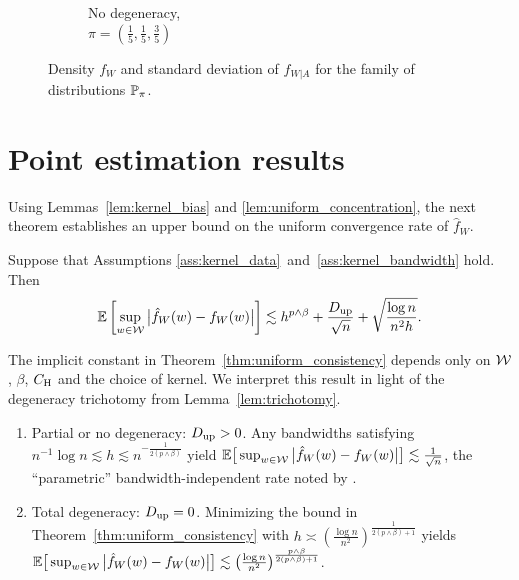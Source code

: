 \begin{figure}[ht]
\begin{subfigure}{0.32\textwidth}
    \caption{
      No degeneracy, \\
      $\pi = \left( \frac{1}{5}, \frac{1}{5}, \frac{3}{5} \right)$
    }
  \end{subfigure}
  \caption{
    Density $f_W$ and standard deviation
    of $f_{W|A}$ for the family of distributions $\P_\pi$.\\
  }
  \label{fig:distribution}
\end{figure}

\section{Point estimation results}\label{sec:point_estimation}

Using Lemmas~\ref{lem:kernel_bias} and \ref{lem:uniform_concentration},
the next theorem establishes an upper bound on the
uniform convergence rate of $\hat f_W$.
%
\begin{theorem}%
  \label{thm:uniform_consistency}%
  Suppose that Assumptions
  \ref{ass:kernel_data}~and~\ref{ass:kernel_bandwidth}
  hold. Then
  \begin{align*}
    \E\left[
      \sup_{w \in \cW}
      \big|\hat{f}_W(w) - f_W(w)\big|
    \right]
    \lesssim
    h^{p\wedge\beta}
    + \frac{\Du}{\sqrt n}
    + \sqrt{\frac{\log n}{n^2h}}.
  \end{align*}
\end{theorem}
%
The implicit constant in Theorem~\ref{thm:uniform_consistency}
depends only on $\cW$, $\beta$, $C_\rH$
and the choice of kernel.
We interpret this result in light of the degeneracy trichotomy
from Lemma~\ref{lem:trichotomy}.
%
\begin{enumerate}[label=(\roman*)]\onehalfspacing
  \item Partial or no degeneracy:
    $\Du > 0$.
    Any bandwidths satisfying
    $n^{-1} \log n \lesssim h \lesssim n^{-\frac{1}{2(p\wedge\beta)}}$
    yield
    $\E\big[\sup_{w \in \cW}\big|\hat f_W(w)
    - f_W(w)\big| \big] \lesssim \frac{1}{\sqrt n}$,
    the ``parametric'' bandwidth-independent rate noted by
    \citet{graham2022kernel}.

  \item Total degeneracy:
    $\Du = 0$.
    Minimizing the bound in
    Theorem~\ref{thm:uniform_consistency} with
    $h \asymp \left( \frac{\log n}{n^2} \right)^{\frac{1}{2(p\wedge\beta)+1}}$
    yields
    $\E\big[ \sup_{w \in \cW} \big|\hat f_W(w) - f_W(w)\big| \big]
    \lesssim
    \big(\frac{\log n}{n^2} \big)^{\frac{p\wedge\beta}{2(p\wedge\beta)+1}}$.
\end{enumerate}

